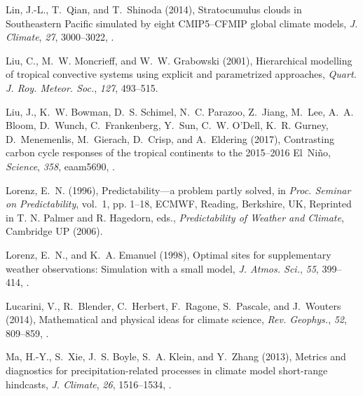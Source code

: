 \documentclass[draft]{agujournal}
\begin{document}
\begin{thebibliography}{196}
Lin, J.-L., T.~Qian, and T.~Shinoda (2014), Stratocumulus clouds in
  {S}outheastern {P}acific simulated by eight {CMIP5}--{CFMIP} global climate
  models, \textit{J. Climate}, \textit{27}, 3000--3022,
  .

Liu, C., M.~W. Moncrieff, and W.~W. Grabowski (2001), Hierarchical modelling of
  tropical convective systems using explicit and parametrized approaches,
  \textit{Quart. J. Roy. Meteor. Soc.}, \textit{127}, 493--515.

Liu, J., K.~W. Bowman, D.~S. Schimel, N.~C. Parazoo, Z.~Jiang, M.~Lee, A.~A.
  Bloom, D.~Wunch, C.~Frankenberg, Y.~Sun, C.~W. O'Dell, K.~R. Gurney,
  D.~Menemenlis, M.~Gierach, D.~Crisp, and A.~Eldering (2017), Contrasting
  carbon cycle responses of the tropical continents to the 2015--2016
  {E}l~{N}i{\~n}o, \textit{Science}, \textit{358}, eaam5690,
  .

Lorenz, E.~N. (1996), Predictability---a problem partly solved, in
  \textit{Proc. Seminar on Predictability}, vol.~1, pp. 1--18, ECMWF, Reading,
  Berkshire, UK, {R}eprinted in T. N. Palmer and R. Hagedorn, eds.,
  \emph{Predictability of Weather and Climate}, Cambridge UP (2006).

Lorenz, E.~N., and K.~A. Emanuel (1998), Optimal sites for supplementary
  weather observations: Simulation with a small model, \textit{J. Atmos. Sci.},
  \textit{55}, 399--414, .

Lucarini, V., R.~Blender, C.~Herbert, F.~Ragone, S.~Pascale, and J.~Wouters
  (2014), Mathematical and physical ideas for climate science, \textit{Rev.
  Geophys.}, \textit{52}, 809--859, .

Ma, H.-Y., S.~Xie, J.~S. Boyle, S.~A. Klein, and Y.~Zhang (2013), Metrics and
  diagnostics for precipitation-related processes in climate model short-range
  hindcasts, \textit{J. Climate}, \textit{26}, 1516--1534,
  .


\end{thebibliography}
\end{document}

